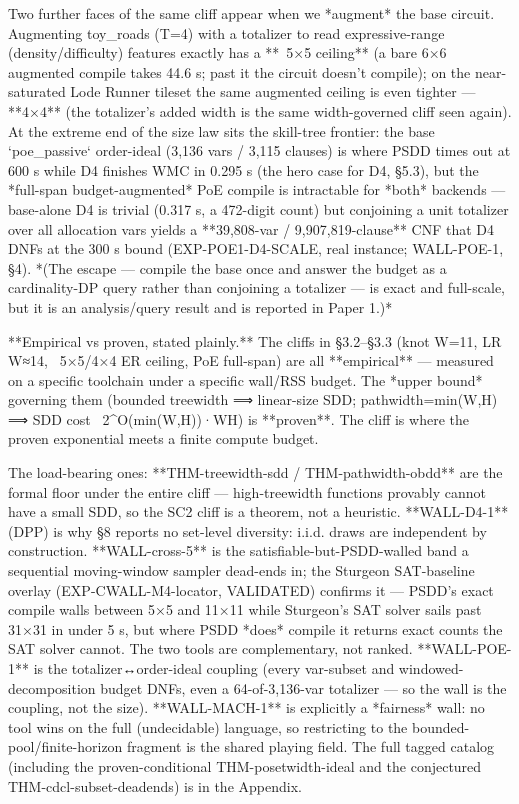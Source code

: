 \documentclass[letterpaper]{article} %
\begin{document}
Two further faces of the same cliff appear when we *augment* the base circuit. Augmenting toy_roads
(T=4) with a totalizer to read expressive-range (density/difficulty) features exactly has a **~5×5
ceiling** (a bare 6×6 augmented compile takes 44.6 s; past it the circuit doesn't compile); on the
near-saturated Lode Runner tileset the same augmented ceiling is even tighter — **4×4** (the
totalizer's added width is the same width-governed cliff seen again). At the extreme end of the size
law sits the skill-tree frontier: the base `poe_passive` order-ideal (3,136 vars / 3,115 clauses) is
where PSDD times out at 600 s while D4 finishes WMC in 0.295 s (the hero case for D4, §5.3), but the
*full-span budget-augmented* PoE compile is intractable for *both* backends — base-alone D4 is
trivial (0.317 s, a 472-digit count) but conjoining a unit totalizer over all allocation vars yields
a **39,808-var / 9,907,819-clause** CNF that D4 DNFs at the 300 s bound (EXP-POE1-D4-SCALE, real
instance; WALL-POE-1, §4). *(The escape — compile the base once and answer the budget as a
cardinality-DP query rather than conjoining a totalizer — is exact and full-scale, but it is an
analysis/query result and is reported in Paper 1.)*

**Empirical vs proven, stated plainly.** The cliffs in §3.2–§3.3 (knot W=11, LR W≈14, ~5×5/4×4 ER
ceiling, PoE full-span) are all **empirical** — measured on a specific toolchain under a specific
wall/RSS budget. The *upper bound* governing them (bounded treewidth ⟹ linear-size SDD;
pathwidth=min(W,H) ⟹ SDD cost ~2^O(min(W,H))·WH) is **proven**. The cliff is where the proven
exponential meets a finite compute budget.

 
The load-bearing ones: **THM-treewidth-sdd / THM-pathwidth-obdd** are the formal floor under the
entire cliff — high-treewidth functions provably cannot have a small SDD, so the SC2 cliff is a
theorem, not a heuristic. **WALL-D4-1** (DPP) is why §8 reports no set-level diversity: i.i.d. draws
are independent by construction. **WALL-cross-5** is the satisfiable-but-PSDD-walled band a sequential
moving-window sampler dead-ends in; the Sturgeon SAT-baseline overlay (EXP-CWALL-M4-locator,
VALIDATED) confirms it — PSDD's exact compile walls between 5×5 and 11×11 while Sturgeon's SAT solver
sails past 31×31 in under 5 s, but where PSDD *does* compile it returns exact counts the SAT solver
cannot. The two tools are complementary, not ranked. **WALL-POE-1** is the totalizer↔order-ideal
coupling (every var-subset and windowed-decomposition budget DNFs, even a 64-of-3,136-var totalizer —
so the wall is the coupling, not the size). **WALL-MACH-1** is explicitly a *fairness* wall: no tool
wins on the full (undecidable) language, so restricting to the bounded-pool/finite-horizon fragment
is the shared playing field. The full tagged catalog (including the proven-conditional
THM-posetwidth-ideal and the conjectured THM-cdcl-subset-deadends) is in the Appendix.
\end{document}
